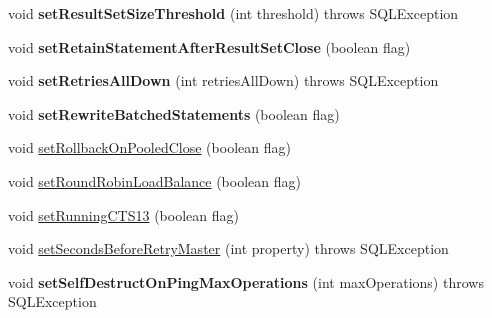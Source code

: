 \begin{DoxyCompactItemize}
void {\bfseries set\+Result\+Set\+Size\+Threshold} (int threshold)  throws S\+Q\+L\+Exception 
\item 
\mbox{\label{classcom_1_1mysql_1_1jdbc_1_1_multi_host_my_s_q_l_connection_a115654613021150af7bccf32628e4c04}} 
void {\bfseries set\+Retain\+Statement\+After\+Result\+Set\+Close} (boolean flag)
\item 
\mbox{\label{classcom_1_1mysql_1_1jdbc_1_1_multi_host_my_s_q_l_connection_a99201ba92e7f8a321b3d804a76d89891}} 
void {\bfseries set\+Retries\+All\+Down} (int retries\+All\+Down)  throws S\+Q\+L\+Exception 
\item 
\mbox{\label{classcom_1_1mysql_1_1jdbc_1_1_multi_host_my_s_q_l_connection_aadb241ffe8fcd5c8892d6d4870689ae8}} 
void {\bfseries set\+Rewrite\+Batched\+Statements} (boolean flag)
\item 
void \mbox{\hyperlink{classcom_1_1mysql_1_1jdbc_1_1_multi_host_my_s_q_l_connection_a1e6e4b6adaf9cf037af7de68ede17aac}{set\+Rollback\+On\+Pooled\+Close}} (boolean flag)
\item 
void \mbox{\hyperlink{classcom_1_1mysql_1_1jdbc_1_1_multi_host_my_s_q_l_connection_abda89933ef464c432ec32e019c84d445}{set\+Round\+Robin\+Load\+Balance}} (boolean flag)
\item 
void \mbox{\hyperlink{classcom_1_1mysql_1_1jdbc_1_1_multi_host_my_s_q_l_connection_a10d268ef01a38535c6b99a9d038bb0db}{set\+Running\+C\+T\+S13}} (boolean flag)
\item 
void \mbox{\hyperlink{classcom_1_1mysql_1_1jdbc_1_1_multi_host_my_s_q_l_connection_a7604c2e4bfbbb42ec5ce170e86970ef3}{set\+Seconds\+Before\+Retry\+Master}} (int property)  throws S\+Q\+L\+Exception 
\item 
\mbox{\label{classcom_1_1mysql_1_1jdbc_1_1_multi_host_my_s_q_l_connection_a14f7cf8108cd80ddc8fcd908fd11b780}} 
void {\bfseries set\+Self\+Destruct\+On\+Ping\+Max\+Operations} (int max\+Operations)  throws S\+Q\+L\+Exception 
\item 
\mbox{\label{classcom_1_1mysql_1_1jdbc_1_1_multi_host_my_s_q_l_connection_aa8dcc6c41819a030a688c32200251995}} 

\end{DoxyCompactItemize}
